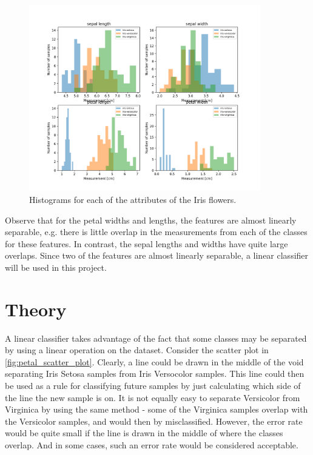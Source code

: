 \documentclass{article}
\begin{document}
\begin{figure}[h]
    \centering
    \includegraphics[width=0.9\textwidth]{../images/iris_histograms.png}
    \caption{Histograms for each of the attributes of the Iris flowers.}
    \label{fig:histograms}
\end{figure}

Observe that for the petal widths and lengths, the features are almost linearly separable, e.g.
there is little overlap in the measurements from each of the classes for these features. In contrast,
the sepal lengths and widths have quite large overlaps. Since two of the features are almost
linearly separable, a linear classifier will be used in this project.

\section{Theory}\label{sec:theory}

A linear classifier takes advantage of the fact that some classes may be separated by using a
linear operation on the dataset. Consider the scatter plot in \autoref{fig:petal_scatter_plot}.
Clearly, a line could be drawn in the middle of the void separating Iris Setosa samples from
Iris Versocolor samples. This line could then be used as a rule for classifying future samples
by just calculating which side of the line the new sample is on. It is not equally easy to
separate Versicolor from Virginica by using the same method - some of the Virginica samples overlap
with the Versicolor samples, and would then by misclassified. However, the error rate would be
quite small if the line is drawn in the middle of where the classes overlap. And in some cases,
such an error rate would be considered acceptable.
\end{document}
